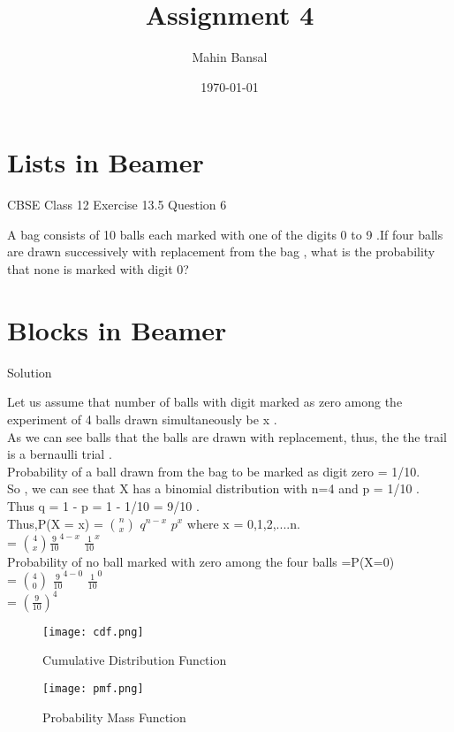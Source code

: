 \documentclass{beamer}
\title{Assignment 4}
\author{Mahin Bansal}
\date{\today}
\begin{document}
\begin{frame}
    \titlepage 
\end{frame}

\logo{}





\section{Lists in Beamer}
\begin{frame}{ CBSE Class 12 Exercise 13.5 Question 6}

A bag consists of 10 balls each marked with one of the digits 0 to 9 .If four balls are drawn successively with replacement from the bag , what is the probability that none is marked with digit 0?
\end{frame}


\section{Blocks in Beamer}
\begin{frame}{Solution}

Let us assume that number of balls with digit marked as zero among the experiment of 4 balls drawn simultaneously be x .\\
As we can see balls that the balls are drawn with replacement, thus, the the trail is a bernaulli trial .\\
Probability of a ball drawn from the bag to be marked as digit zero  = 1/10.\\
So , we can see that X has a binomial distribution with n=4 and p = 1/10 .\\
Thus q = 1 - p = 1 - 1/10 = 9/10 .\\
Thus,P(X = x) = $ n\choose x$ $ q^{n-x}$ $ p^ x$ where x = 0,1,2,....n.\\
= $ 4\choose x$$\frac{9}{10}^{4-x}$ $ \frac{1}{10}^ x$\\
Probability of no ball marked with zero among the four balls =P(X=0)\\
= $ 4\choose 0$ $ \frac{9}{10}^{4-0}$ $ \frac{1}{10}^ 0$\\
= $(\frac{9}{10})^4$\\
\end{frame}
\begin{frame}
 \begin{figure}[!ht]
		\centering
		\texttt{[image: cdf.png]}
		\caption{Cumulative Distribution Function}
		\label{fig}
	\end{figure}
\end{frame}
\begin{frame}
\begin{figure}[!ht]
		\centering
		\texttt{[image: pmf.png]}
		\caption{Probability Mass Function}
		\label{fig1}
	\end{figure}


\end{frame}
\end{document}
